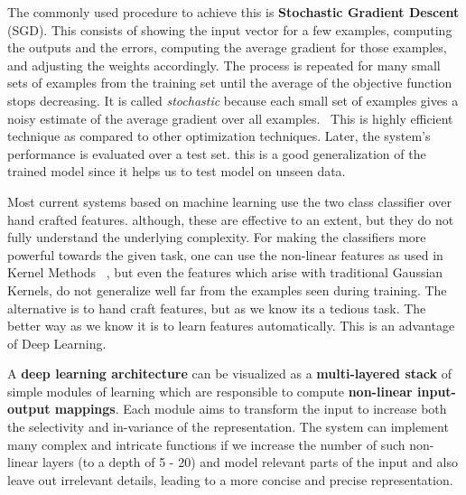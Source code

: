 The commonly used procedure to achieve this is\textbf{ Stochastic Gradient Descent }(SGD). This consists of showing the input vector for a few examples, computing the outputs and the errors, computing the average gradient for those examples, and adjusting the weights accordingly. The process is repeated for many small sets of examples from the training set until the average of the objective function stops decreasing. It is called \textit{stochastic} because each small set of examples gives a noisy estimate of the average gradient over all examples.~\parencite{naturearticle} This is highly efficient technique as compared to other optimization techniques. Later, the system's performance is evaluated over a test set. this is a good generalization of the trained model since it helps us to test model on unseen data. 
\newline

Most current systems based on machine learning use the two class classifier over hand crafted features. although, these are effective to an extent, but they do not fully understand the underlying complexity. For making the classifiers more powerful towards the given task, one can use the non-linear features as used in Kernel Methods ~\parencite{learnkernels}, but even the features which arise with traditional Gaussian Kernels, do not generalize well far from the examples seen during training. The alternative is to hand craft features, but as we know its a tedious task. The better way as we know it is to learn features automatically. This is an advantage of Deep Learning.
\newline

A \textbf{deep learning architecture} can be visualized as a \textbf{multi-layered stack} of simple modules of learning which are responsible to compute \textbf{non-linear input-output mappings}. Each module aims to transform the input to increase both the selectivity and in-variance of the representation. The system can implement many complex and intricate functions if we increase the number of such non-linear layers (to a depth of 5 - 20) and model relevant parts of the input and also leave out irrelevant details, leading to a more concise and precise representation.    

